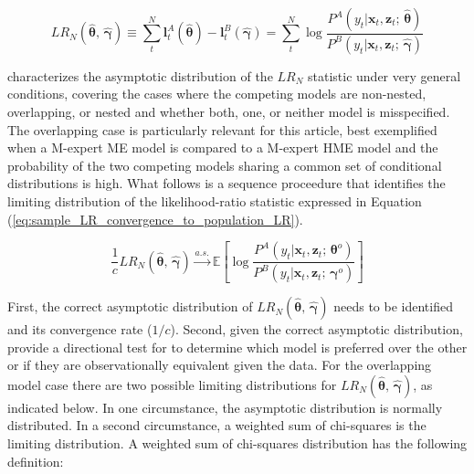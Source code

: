\documentclass[12pt]{article}
\theoremstyle{definition}
\begin{document}
\begin{equation} \label{eq:LR_statistic}
  LR_{N} (\hat{\boldsymbol{\theta}}, \, \hat{\boldsymbol{\gamma}}) \equiv  \sum_{t}^{N} \boldsymbol{l}^{A}_{t}(\hat{\boldsymbol{\theta}}) - \boldsymbol{l}^{B}_{t}(\hat{\boldsymbol{\gamma}}) = \sum_{t}^{N} \log \frac{ P^{A}(y_{t} | \boldsymbol{x}_{t}, \boldsymbol{z}_{t}; \, \hat{\boldsymbol{\theta}}) }{ P^{B}(y_{t} | \boldsymbol{x}_{t}, \boldsymbol{z}_{t}; \, \hat{\boldsymbol{\gamma}}) }
\end{equation}

\citet{Voung1989} characterizes the asymptotic distribution of the $LR_{N}$ statistic under very general
conditions, covering the cases where the competing models are non-nested, overlapping,
or nested and whether both, one, or neither model is misspecified.
The overlapping case is particularly relevant for this article, best exemplified 
when a M-expert ME model is compared to a M-expert HME model and the probability
of the two competing models sharing a common set of conditional distributions
is high. What follows is a sequence proceedure that identifies the limiting
distribution of the likelihood-ratio statistic expressed in Equation
(\ref{eq:sample_LR_convergence_to_population_LR}).

\begin{equation} \label{eq:sample_LR_convergence_to_population_LR}
  \frac{1}{c} LR_{N}(\hat{\boldsymbol{\theta}}, \, \hat{\boldsymbol{\gamma}}) \overset{a.s.}{\longrightarrow} \mathbb{E} \left[ \log \frac{P^{A}(y_{t} | \boldsymbol{x}_{t}, \boldsymbol{z}_{t}; \, \boldsymbol{\theta}^{o})}{P^{B}(y_{t} | \boldsymbol{x}_{t}, \boldsymbol{z}_{t}; \, \boldsymbol{\gamma}^{o})} \right]
\end{equation}

First, the correct asymptotic distribution of
$LR_{N}(\hat{\boldsymbol{\theta}}, \, \hat{\boldsymbol{\gamma}})$ needs to be 
identified and its convergence rate ($1/c$). Second, given the correct asymptotic
distribution, provide a directional test for to determine which model is preferred over
the other or if they are observationally equivalent given the data.
For the overlapping model case there are two possible limiting distributions
for $LR_{N}(\hat{\boldsymbol{\theta}}, \, \hat{\boldsymbol{\gamma}})$, as indicated
below. In one circumstance, the asymptotic distribution is normally distributed.
In a second circumstance, a weighted sum of chi-squares is the limiting distribution.
A weighted sum of chi-squares distribution has the following definition:
\end{document}
